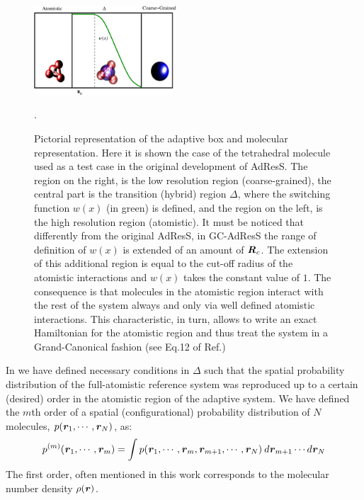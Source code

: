 \documentclass[a4paper,preprint,unsortedaddress]{revtex4-1}
\newcommand{\recheck}[1]{{\color{red} #1}}
\newcommand{\vect}[1]{\textbf{\textit{#1}}}
\begin{document}
\begin{figure}
\center
\includegraphics[width=0.475\textwidth]{adapt-schem.eps}
\caption{Pictorial representation of the adaptive box and
molecular representation. Here it is shown the case of the tetrahedral molecule used as a test case in the original development of AdResS. The region on the right,
is the low resolution region (coarse-grained), the central part is
the transition (hybrid) region $\Delta$, where the switching function
$w(x)$ (in green) is defined, and the region on the left, is the high resolution region (atomistic). It must be noticed that differently from the original AdResS, in GC-AdResS the range of definition of $w(x)$ is extended of an amount of ${\vect R}_{c}$. The extension of this additional region is equal to the cut-off radius of the atomistic interactions and $w(x)$ takes the constant value of $1$. The consequence is that molecules in the atomistic region interact with the rest of the system always and only via well defined atomistic interactions. This characteristic, in turn, allows to write an exact Hamiltonian for the atomistic region and thus treat the system in a Grand-Canonical fashion \recheck{(see Eq.12 of Ref.\cite{prx})}}.
\label{fig1}
\end{figure} 
In \cite{prx} we have defined necessary conditions in $\Delta$ such that the spatial probability distribution of the full-atomistic reference system was reproduced up to a certain (desired) order in the atomistic region of the adaptive system. \recheck{We have defined the $m$th order of a spatial (configurational) probability distribution of $N$ molecules, $p({\vect r}_{1}, \cdots, {\vect r}_{N})$, as:
\begin{equation}
p^{(m)}({\vect r}_{1}, \cdots, {\vect r}_{m})=\int p({\vect r}_{1}, \cdots, {\vect r}_{m},{\vect r}_{m+1}, \cdots, {\vect r}_{N}) \: d{\vect r}_{m+1}\cdots d{\vect r}_{N}
\label{order}
\end{equation}
The first order, often mentioned in this work corresponds to the molecular number density $\rho({\vect r})$.}
\end{document}
